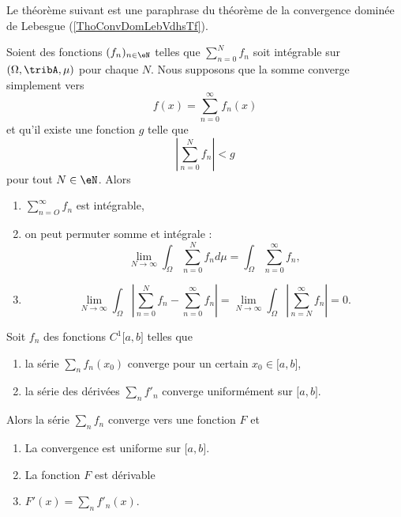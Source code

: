 Le théorème suivant est une paraphrase du théorème de la convergence dominée de Lebesgue (\ref{ThoConvDomLebVdhsTf}).
\begin{theorem}     \label{ThoockMHn}
    Soient des fonctions \( (f_n)_{n\in \eN}\) telles que \( \sum_{n=0}^Nf_n\) soit intégrable sur \( (\Omega,\tribA,\mu)\) pour chaque \( N\). Nous supposons que la somme converge simplement vers
    \begin{equation}
        f(x)=\sum_{n=0}^{\infty}f_n(x)
    \end{equation}
    et qu'il existe une fonction \( g\) telle que
    \begin{equation}
        \left| \sum_{n=0}^Nf_n \right| <g
    \end{equation}
    pour tout \( N\in \eN\). Alors
    \begin{enumerate}
        \item
            \( \sum_{n=O}^{\infty}f_n\) est intégrable,
        \item
            on peut permuter somme et intégrale :
            \begin{equation}
                \lim_{N\to \infty} \int_{\Omega}\sum_{n=0}^Nf_nd\mu=\int_{\Omega}\sum_{n=0}^{\infty}f_n,
            \end{equation}
        \item
            \begin{equation}
                \lim_{N\to \infty} \int_{\Omega}\left| \sum_{n=0}^Nf_n-\sum_{n=0}^{\infty}f_n \right| =\lim_{N\to \infty} \int_{\Omega}\left| \sum_{n=N}^{\infty}f_n \right| =0.
            \end{equation}
    \end{enumerate}
\end{theorem}


\begin{theorem} \label{ThoCSGaPY}
    Soit \( f_n\) des fonctions \( C^1\mathopen[ a , b \mathclose]\) telles que
    \begin{enumerate}
        \item
            la série \( \sum_n f_n(x_0)\) converge pour un certain \( x_0\in\mathopen[ a , b \mathclose]\),
        \item
            la série des dérivées \( \sum_n f'_n\) converge uniformément sur \( \mathopen[ a , b \mathclose]\).
    \end{enumerate}
    Alors la série \( \sum_n f_n\) converge vers une fonction \( F\) et
    \begin{enumerate}
        \item
            La convergence est uniforme sur \( \mathopen[ a , b \mathclose]\).
        \item
            La fonction \( F\) est dérivable
        \item
            \( F'(x)=\sum_nf'_n(x)\).
    \end{enumerate}
\end{theorem}

